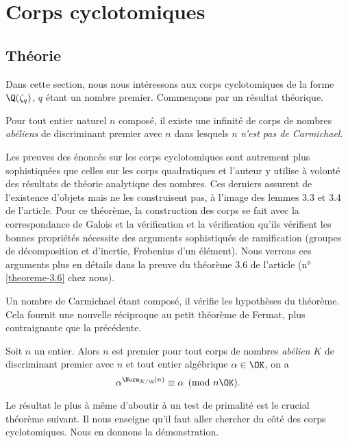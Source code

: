 \section{Corps cyclotomiques}

\subsection{Théorie}

Dans cette section, nous nous intéressons aux corps cyclotomiques de la forme $\Q(\zeta_q)$, $q$ étant un nombre premier. Commençons par un résultat théorique.

\begin{theoreme}
	Pour tout entier naturel $n$ composé, il existe une infinité de corps de nombres \emph{abéliens} de discriminant premier avec $n$ dans lesquels $n$ \emph{n'est pas de Carmichael}.
\end{theoreme}

\begin{MotSurPreuve}
	Les preuves des énoncés sur les corps cyclotomiques sont autrement plus sophistiquées que celles sur les corps quadratiques et l'auteur y utilise à volonté des résultats de théorie analytique des nombres. Ces derniers assurent de l'existence d'objets mais ne les construisent pas, à l'image des lemmes 3.3 et 3.4 de l'article. Pour ce théorème, la construction des corps se fait avec la correspondance de Galois et la vérification et la vérification qu'ils vérifient les bonnes propriétés nécessite des arguments sophistiqués de ramification (groupes de décomposition et d'inertie, Frobenius d'un élément). Nous verrons ces arguments plus en détails dans la preuve du théorème 3.6 de l'article (n°\ref{theoreme-3.6} chez nous). \\
\end{MotSurPreuve}

Un nombre de Carmichael étant composé, il vérifie les hypothèses du théorème. Cela fournit une nouvelle réciproque au petit théorème de Fermat, plus contraignante que la précédente.

\begin{theoreme}
	Soit $n$ un entier. Alors $n$ est premier \ssi pour tout corps de nombres \emph{abélien} $K$ de discriminant premier avec $n$ et tout entier algébrique $\alpha \in \OK$, on a $$\alpha^{\Norm_{K/\Q}(n)} \equiv \alpha \pmod{n\OK}.$$
\end{theoreme}

Le résultat le plus à même d'aboutir à un test de primalité est le crucial théorème suivant. Il nous enseigne qu'il faut aller chercher du côté des corps cyclotomiques. Nous en donnons la démonstration.

